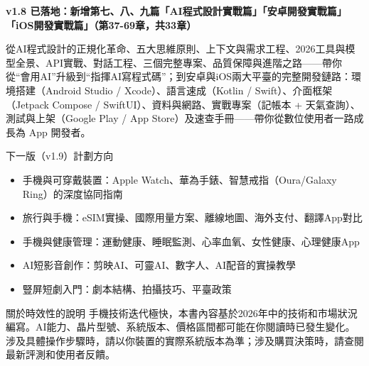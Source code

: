 

\textbf{v1.8 已落地：新增第七、八、九篇「AI程式設計實戰篇」「安卓開發實戰篇」「iOS開發實戰篇」（第37-69章，共33章）}\par

從AI程式設計的正規化革命、五大思維原則、上下文與需求工程、2026工具與模型全景、API實戰、對話工程、三個完整專案、品質保障與進階之路——帶你從“會用AI”升級到“指揮AI寫程式碼”；到安卓與iOS兩大平臺的完整開發鏈路：環境搭建（Android Studio / Xcode）、語言速成（Kotlin / Swift）、介面框架（Jetpack Compose / SwiftUI）、資料與網路、實戰專案（記帳本 + 天氣查詢）、測試與上架（Google Play / App Store）及速查手冊——帶你從數位使用者一路成長為 App 開發者。

\begin{tcbinfo}{下一版（v1.9）計劃方向}
\begin{itemize}
  \item 手機與可穿戴裝置：Apple Watch、華為手錶、智慧戒指（Oura/Galaxy Ring）的深度協同指南
  \item 旅行與手機：eSIM實操、國際用量方案、離線地圖、海外支付、翻譯App對比
  \item 手機與健康管理：運動健康、睡眠監測、心率血氧、女性健康、心理健康App
  \item AI短影音創作：剪映AI、可靈AI、數字人、AI配音的實操教學
  \item 豎屏短劇入門：劇本結構、拍攝技巧、平臺政策
\end{itemize}

\end{tcbinfo}

\begin{tcbwarn}{關於時效性的說明}
手機技術迭代極快，本書內容基於2026年中的技術和市場狀況編寫。AI能力、晶片型號、系統版本、價格區間都可能在你閱讀時已發生變化。涉及具體操作步驟時，請以你裝置的實際系統版本為準；涉及購買決策時，請查閱最新評測和使用者反饋。

\end{tcbwarn}
